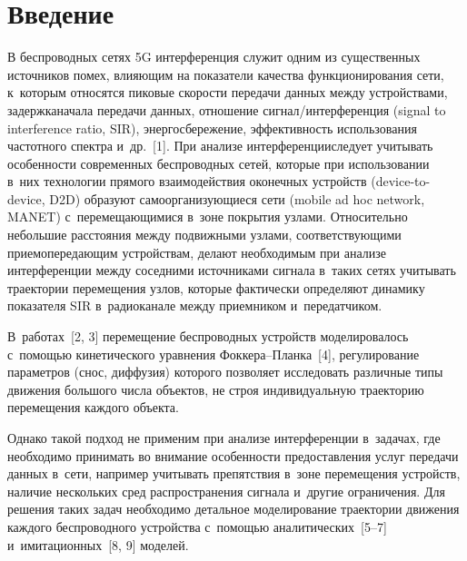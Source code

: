
  
\vspace*{5pt}



\thispagestyle{headings}

\begin{multicols}{2}

\label{st\stat}

\section{Введение}

  В беспроводных сетях 5G интерференция служит одним из существенных 
источников помех, вли\-я\-ющим на показатели качества функционирования 
сети, к~которым относятся пиковые ско\-рости передачи данных между 
устройствами, задержка\linebreak начала передачи данных, отношение 
сигнал/\-ин\-тер\-фе\-рен\-ция (signal to interference ratio, SIR), энер\-го\-сбе\-ре\-же\-ние, 
эффективность использования частот\-но\-го спектра и~др.~[1]. При анализе 
интерференции\linebreak следует учитывать особенности современных беспроводных 
сетей, которые при использовании в~них технологии прямого взаимодействия 
оконечных устройств (device-to-device, D2D) образуют самоорганизующиеся 
сети (mobile ad hoc network, MANET) с~перемещающимися в~зоне покрытия 
узлами.\linebreak
 Относительно небольшие расстояния между подвижными узлами, 
соответствующими при\-емо\-пе\-ре\-да\-ющим устройствам, делают необходимым 
при анализе интерференции между соседними источниками сигнала в~таких 
сетях учитывать траектории перемещения узлов, которые фактически 
определяют динамику показателя SIR в~радиоканале между приемником 
и~передатчиком. 

В~работах~[2, 3] перемещение беспроводных устройств 
моделировалось с~по\-мощью ки\-не\-ти\-ческого уравнения  
Фок\-ке\-ра--Планка~[4], регулирование па\-ра\-мет\-ров (снос, диффузия) 
которого позволяет исследовать различные типы движения большого чис\-ла 
объектов, не строя индивидуальную траекторию перемещения каждого 
объекта. 

Однако такой подход не применим при анализе интерференции 
в~задачах, где необходимо принимать во внимание особенности 
предоставления услуг передачи данных в~сети, например учитывать 
препятствия в~зоне перемещения устройств, наличие нескольких сред 
распространения сигнала и~другие ограничения. Для решения таких задач 
необходимо детальное моделирование траектории движения каждого 
беспроводного устройства с~по\-мощью аналитических~[5--7] 
и~имитационных~[8, 9] моделей. 





\end{multicols}

